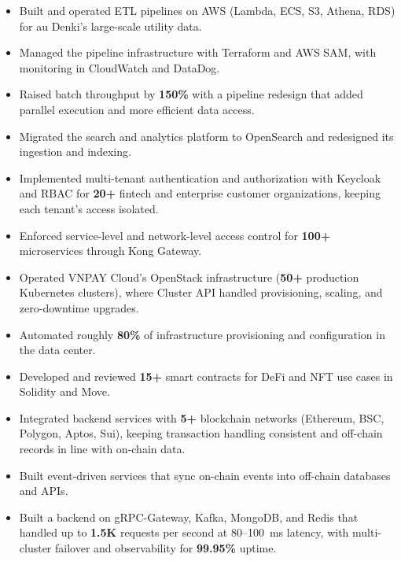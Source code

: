 \jobVietlink
\begin{itemize}
    \item Built and operated ETL pipelines on AWS (Lambda, ECS, S3, Athena, RDS) for au Denki's large-scale utility data. %
    \item Managed the pipeline infrastructure with Terraform and AWS SAM, with monitoring in CloudWatch and DataDog. %
    \item Raised batch throughput by \textbf{150\%} with a pipeline redesign that added parallel execution and more efficient data access. %
    \item Migrated the search and analytics platform to OpenSearch and redesigned its ingestion and indexing. %
\end{itemize}

\begin{itemize}
    \item Implemented multi-tenant authentication and authorization with Keycloak and RBAC for \textbf{20+} fintech and enterprise customer organizations, keeping each tenant's access isolated. %
    \item Enforced service-level and network-level access control for \textbf{100+} microservices through Kong Gateway. %
    \item Operated VNPAY Cloud's OpenStack infrastructure (\textbf{50+} production Kubernetes clusters), where Cluster API handled provisioning, scaling, and zero-downtime upgrades. %
    \item Automated roughly \textbf{80\%} of infrastructure provisioning and configuration in the data center. %
\end{itemize}

\begin{itemize}
    \item Developed and reviewed \textbf{15+} smart contracts for DeFi and NFT use cases in Solidity and Move. %
    \item Integrated backend services with \textbf{5+} blockchain networks (Ethereum, BSC, Polygon, Aptos, Sui), keeping transaction handling consistent and off-chain records in line with on-chain data. %
    \item Built event-driven services that sync on-chain events into off-chain databases and APIs. %
\end{itemize}


\projDattingQ
\begin{itemize}
    \item Built a backend on gRPC-Gateway, Kafka, MongoDB, and Redis that handled up to \textbf{1.5K} requests per second at 80--100~ms latency, with multi-cluster failover and observability for \textbf{99.95\%} uptime. %
\end{itemize}

\cveducation



